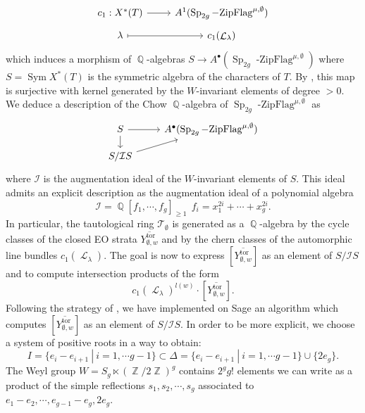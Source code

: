 \documentclass[11pt]{amsart}
\numberwithin{subsection}{section}
\numberwithin{figure}{section}
\numberwithin{table}{section}
\theoremstyle{1}
\theoremstyle{2}
\DeclareMathOperator{\Z}{\mathbb{Z}}
\DeclareMathOperator{\Q}{\mathbb{Q}}
\DeclareMathOperator{\Sp}{Sp}
\DeclareMathOperator{\ZipFlag}{-ZipFlag}
\DeclareMathOperator{\Sym}{Sym}
\DeclareMathOperator{\tor}{tor}
\DeclareMathOperator{\Lc}{\mathcal{L}}
\begin{document}
\begin{equation*}
\begin{tikzcd}[row sep = tiny]
c_1 : X^*(T) \arrow[r] & A^1(\Sp_{2g}\ZipFlag^{\mu,\emptyset}) \\
\lambda \arrow[r,mapsto] & c_1(\Lc_{\lambda})
\end{tikzcd}
\end{equation*}
which induces a morphism of $\Q$-algebras $S \rightarrow A^{\bullet}(\Sp_{2g}\ZipFlag^{\mu,\emptyset})$ where $S = \Sym X^*(T)$ is the symmetric algebra of the characters of $T$. By \cite[Theorem 3]{wedhorn2018tautological}, this map is surjective with kernel generated by the $W$-invariant elements of degree $>0$. We deduce a description of the Chow $\Q$-algebra of $\Sp_{2g}\ZipFlag^{\mu,\emptyset}$ as 
\begin{equation*}
\begin{tikzcd}[row sep = small]
S \arrow[r] \arrow[d] & A^{\bullet}(\Sp_{2g}\ZipFlag^{\mu,\emptyset}) \\
S/\mathcal{I}S \arrow[ru]
\end{tikzcd}
\end{equation*}
where $\mathcal{I}$ is the augmentation ideal of the $W$-invariant elements of $S$. This ideal admits an explicit description as the augmentation ideal of a polynomial algebra
\begin{equation*}
\mathcal{I} = \Q[f_1,\cdots,f_g]_{\geq 1} \ \ f_i = x_1^{2i}+\cdots+x_g^{2i}.
\end{equation*}
In particular, the tautological ring $\mathcal{T}_{\emptyset}$ is generated as a $\Q$-algebra by the cycle classes of the closed EO strata $\overline{Y^{\tor}_{\emptyset,w}}$ and by the chern classes of the automorphic line bundles $c_1(\Lc_{\lambda})$. The goal is now to express $[\overline{Y^{\tor}_{\emptyset,w}}]$ as an element of $S/\mathcal{I}S$ and to compute intersection products of the form
\begin{equation*}
c_1(\Lc_{\lambda})^{l(w)}\cdot [\overline{Y^{\tor}_{\emptyset,w}}].
\end{equation*}
Following the strategy of \cite{wedhorn2018tautological}, we have implemented on Sage an algorithm which computes $[\overline{Y^{\tor}_{\emptyset,w}}]$ as an element of $S/\mathcal{I}S$. In order to be more explicit, we choose a system of positive roots in a way to obtain:
\begin{equation*}
I = \{e_i-e_{i+1} \ | \ i = 1, \cdots g-1 \}  \subset \Delta = \{e_i-e_{i+1} \ | \ i = 1, \cdots g-1 \} \cup \{2e_g\}.
\end{equation*}
The Weyl group $W = S_g \ltimes ({\Z}/{2\Z})^{g}$ contains $2^gg!$ elements we can write as a product of the simple reflections $s_1, s_2, \cdots, s_g$ associated to $e_1-e_{2},\cdots, e_{g-1}-e_{g},2e_g$.
\end{document}
